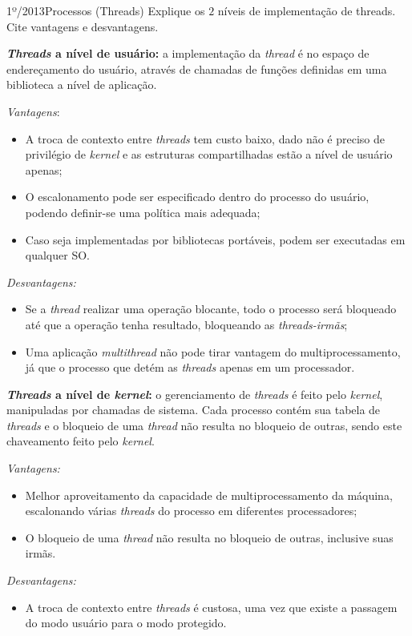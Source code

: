 \begin{exercicio}
  {1º/2013}{Processos (Threads)}
  {Explique os $2$ níveis de implementação de threads. Cite vantagens e desvantagens.}

  \textbf{\textit{Threads} a nível de usuário:} a implementação da \textit{thread} é no espaço de endereçamento do usuário, através de chamadas de funções definidas em uma biblioteca a nível de aplicação.

  \textit{Vantagens}:
  \begin{itemize}
    \item A troca de contexto entre \textit{threads} tem custo baixo, dado não é preciso de privilégio de \textit{kernel} e as estruturas compartilhadas estão a nível de usuário apenas;

    \item O escalonamento pode ser especificado dentro do processo do usuário, podendo definir-se uma política mais adequada;

    \item Caso seja implementadas por bibliotecas portáveis, podem ser executadas em qualquer SO.
  \end{itemize}

  \textit{Desvantagens:}
  \begin{itemize}
    \item Se a \textit{thread} realizar uma operação blocante, todo o processo será bloqueado até que a operação tenha resultado, bloqueando as \textit{threads-irmãs};

    \item Uma aplicação \textit{multithread} não pode tirar vantagem do multiprocessamento, já que o processo que detém as \textit{threads} apenas em um processador.
  \end{itemize}

  \textbf{\textit{Threads} a nível de \textit{kernel}:} o gerenciamento de \textit{threads} é feito pelo \textit{kernel}, manipuladas por chamadas de sistema. Cada processo contém sua tabela de \textit{threads} e o bloqueio de uma \textit{thread} não resulta no bloqueio de outras, sendo este chaveamento feito pelo \textit{kernel}.

  \textit{Vantagens:}
  \begin{itemize}
    \item Melhor aproveitamento da capacidade de multiprocessamento da máquina, escalonando várias \textit{threads} do processo em diferentes processadores;

    \item O bloqueio de uma \textit{thread} não resulta no bloqueio de outras, inclusive suas irmãs.
  \end{itemize}

  \textit{Desvantagens:}
  \begin{itemize}
    \item A troca de contexto entre \textit{threads} é custosa, uma vez que existe a passagem do modo usuário para o modo protegido.
  \end{itemize}





\end{exercicio}
